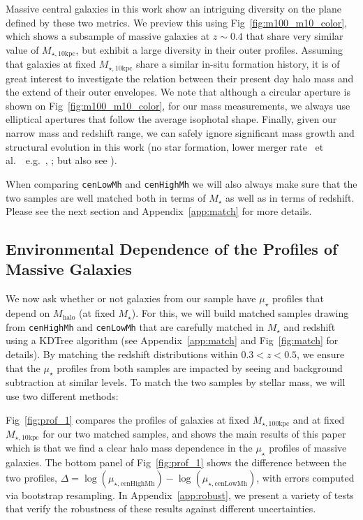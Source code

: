 \documentclass[a4paper,fleqn,usenatbib]{mnras}
\def\etal{{\ et al.~}}
\def\rbcg{\texttt{cenHighMh}}
\def\nbcg{\texttt{cenLowMh}}
\def\mstar{{$M_{\star}$}}
\def\mhalo{{$M_{\mathrm{halo}}$}}
\def\minn{{$M_{\star,10\mathrm{kpc}}$}}
\def\mtot{{$M_{\star,100\mathrm{kpc}}$}}
\def\mden{{$\mu_{\star}$}}
\begin{document}
    Massive central galaxies in this work show an intriguing diversity on the plane 
    defined by these two metrics.  
    We preview this using Fig~\ref{fig:m100_m10_color}, which shows a subsample of 
    massive galaxies at $z{\sim} 0.4$ that share very similar value of \minn{}, but 
    exhibit a large diversity in their outer profiles. 
    Assuming that galaxies at fixed \minn{} share a similar in-situ formation history, 
    it is of great interest to investigate the relation between their present day halo 
    mass and the extend of their outer envelopes. 
    We note that although a circular aperture is shown on Fig~\ref{fig:m100_m10_color}, 
    for our mass measurements, we always use elliptical apertures that follow the 
    average isophotal shape. Finally, given our narrow mass and redshift range, we 
    can safely ignore significant mass growth and structural evolution in this work
    (no star formation, lower merger rate \etal~e.g.\ \citealt{Bellstedt2016},
    \citealt{Inagaki2015}; but also see \citealt{Bai2014}). 



    When comparing \nbcg{} and \rbcg{} we will also always make sure that the two 
    samples are well matched both in terms of \mstar{} as well as in terms of redshift. 
    Please see the next section and Appendix~\ref{app:match} for more details.

\subsection{Environmental Dependence of the Profiles of Massive Galaxies}
    \label{ssec:sbp_mtot} 
       
    We now ask whether or not galaxies from our sample have \mden{} profiles that 
    depend on \mhalo{} (at fixed \mstar{}). 
    For this, we will build matched samples drawing from \rbcg{} and \nbcg{} that are 
    carefully matched in \mstar{} and redshift using a KDTree algorithm 
    (see Appendix~\ref{app:match} and Fig~\ref{fig:match} for details). 
    By matching the redshift distributions within $0.3 < z < 0.5$, we ensure that the 
    \mden{} profiles from both samples are impacted by seeing and background subtraction 
    at similar levels. 
    To match the two samples by stellar mass, we will use two different methods:

    Fig~\ref{fig:prof_1} compares the profiles of galaxies at fixed \mtot{} and at fixed 
    \minn{} for our two matched samples, and shows the main results of this paper which 
    is that we find a clear halo mass dependence in the \mden{} profiles of massive 
    galaxies. 
    The bottom panel of Fig~\ref{fig:prof_1} shows the difference between the two 
    profiles, $\Delta = \log(\mu_{\star, \mathrm{cenHighMh}}) - 
    \log(\mu_{\star, \mathrm{cenLowMh}})$, 
    with errors computed via bootstrap resampling. 
    In Appendix~\ref{app:robust}, we present a variety of tests that verify the 
    robustness of these results against different uncertainties.
   
\end{document}
